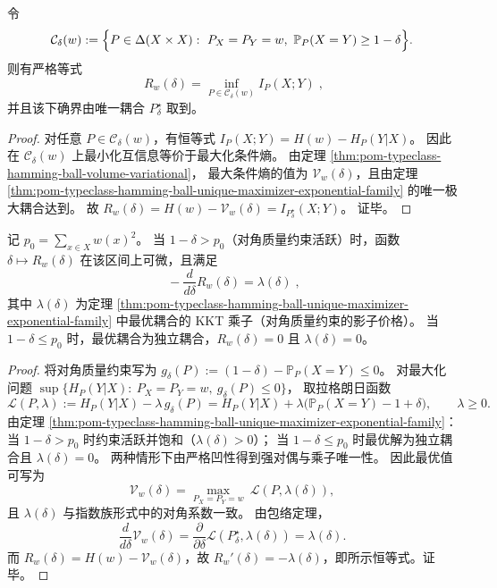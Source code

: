 \begin{theorem}\label{thm:pom-typeclass-rate-distortion-mutual-information}
令
\[
\mathcal C_\delta(w):=\Bigl\{P\in\Delta(X\times X):\ P_X=P_Y=w,\ \mathbb P_P(X=Y)\ge 1-\delta\Bigr\}.
\]
则有严格等式
\[
\boxed{\;
R_w(\delta)=\inf_{P\in\mathcal C_\delta(w)} I_P(X;Y)\; } ,
\]
并且该下确界由唯一耦合 \(P^\star_\delta\) 取到。
\end{theorem}
\begin{proof}
对任意 \(P\in\mathcal C_\delta(w)\)，有恒等式
\(
I_P(X;Y)=H(w)-H_P(Y|X)
\)。
因此在 \(\mathcal C_\delta(w)\) 上最小化互信息等价于最大化条件熵。
由定理 \ref{thm:pom-typeclass-hamming-ball-volume-variational}，
最大条件熵的值为 \(\mathcal V_w(\delta)\)，且由定理 \ref{thm:pom-typeclass-hamming-ball-unique-maximizer-exponential-family} 的唯一极大耦合达到。
故
\(
R_w(\delta)=H(w)-\mathcal V_w(\delta)=I_{P^\star_\delta}(X;Y)
\)。
证毕。
\end{proof}

\begin{theorem}\label{thm:pom-typeclass-dual-derivative}
记 \(p_0=\sum_{x\in X}w(x)^2\)。
当 \(1-\delta>p_0\)（对角质量约束活跃）时，函数 \(\delta\mapsto R_w(\delta)\) 在该区间上可微，且满足
\[
\boxed{\;
-\frac{d}{d\delta}R_w(\delta)=\lambda(\delta)\; } ,
\]
其中 \(\lambda(\delta)\) 为定理 \ref{thm:pom-typeclass-hamming-ball-unique-maximizer-exponential-family} 中最优耦合的 KKT 乘子（对角质量约束的影子价格）。
当 \(1-\delta\le p_0\) 时，最优耦合为独立耦合，\(R_w(\delta)=0\) 且 \(\lambda(\delta)=0\)。
\end{theorem}
\begin{proof}
将对角质量约束写为
\(
g_\delta(P):=(1-\delta)-\mathbb P_P(X=Y)\le 0
\)。
对最大化问题
\(
\sup\{H_P(Y|X):\ P_X=P_Y=w,\ g_\delta(P)\le 0\}
\)，
取拉格朗日函数
\[
\mathscr L(P,\lambda)
:=H_P(Y|X)-\lambda\,g_\delta(P)
=H_P(Y|X)+\lambda\bigl(\mathbb P_P(X=Y)-1+\delta\bigr),
\qquad \lambda\ge 0.
\]
由定理 \ref{thm:pom-typeclass-hamming-ball-unique-maximizer-exponential-family}：
当 \(1-\delta>p_0\) 时约束活跃并饱和（\(\lambda(\delta)>0\)）；
当 \(1-\delta\le p_0\) 时最优解为独立耦合且 \(\lambda(\delta)=0\)。
两种情形下由严格凹性得到强对偶与乘子唯一性。
因此最优值可写为
\[
\mathcal V_w(\delta)=\max_{P_X=P_Y=w}\ \mathscr L(P,\lambda(\delta)),
\]
且 \(\lambda(\delta)\) 与指数族形式中的对角系数一致。
由包络定理，
\[
\frac{d}{d\delta}\mathcal V_w(\delta)=\frac{\partial}{\partial\delta}\mathscr L(P^\star_\delta,\lambda(\delta))=\lambda(\delta).
\]
而 \(R_w(\delta)=H(w)-\mathcal V_w(\delta)\)，故 \(R_w'(\delta)=-\lambda(\delta)\)，即所示恒等式。证毕。
\end{proof}

\endinput
